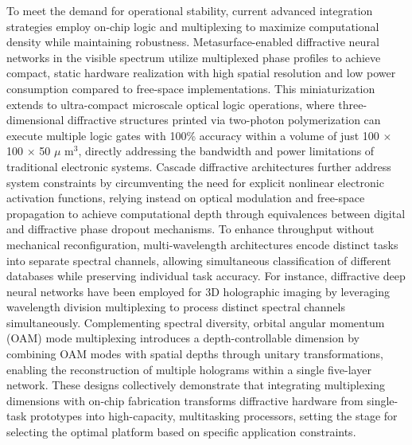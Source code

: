 \documentclass[11pt]{article}
\begin{document}
To meet the demand for operational stability, current advanced integration strategies employ on-chip logic and multiplexing to maximize computational density while maintaining robustness. Metasurface-enabled diffractive neural networks in the visible spectrum utilize multiplexed phase profiles to achieve compact, static hardware realization with high spatial resolution and low power consumption compared to free-space implementations. This miniaturization extends to ultra-compact microscale optical logic operations, where three-dimensional diffractive structures printed via two-photon polymerization can execute multiple logic gates with 100\% accuracy within a volume of just 100 \(\times\) 100 \(\times\) 50 \(\mu\) m\(^{3}\), directly addressing the bandwidth and power limitations of traditional electronic systems. Cascade diffractive architectures further address system constraints by circumventing the need for explicit nonlinear electronic activation functions, relying instead on optical modulation and free-space propagation to achieve computational depth through equivalences between digital and diffractive phase dropout mechanisms. To enhance throughput without mechanical reconfiguration, multi-wavelength architectures encode distinct tasks into separate spectral channels, allowing simultaneous classification of different databases while preserving individual task accuracy. For instance, diffractive deep neural networks have been employed for 3D holographic imaging by leveraging wavelength division multiplexing to process distinct spectral channels simultaneously. \citep{doi_10_1109_acp_ipoc63121_2024_10809872_a7935774} Complementing spectral diversity, orbital angular momentum (OAM) mode multiplexing introduces a depth-controllable dimension by combining OAM modes with spatial depths through unitary transformations, enabling the reconstruction of multiple holograms within a single five-layer network. These designs collectively demonstrate that integrating multiplexing dimensions with on-chip fabrication transforms diffractive hardware from single-task prototypes into high-capacity, multitasking processors, setting the stage for selecting the optimal platform based on specific application constraints. \citep{doi_10_3390_mi16010008_4be72643} \citep{doi_10_1021_acsphotonics_5c02472_283a8bea} \citep{doi_10_1515_nanoph_2022_0615_9a3be8d6} \citep{doi_10_1364_oe_447337_61ffab71} \citep{doi_10_1364_ol_428761_f1f67ac8}
\end{document}
